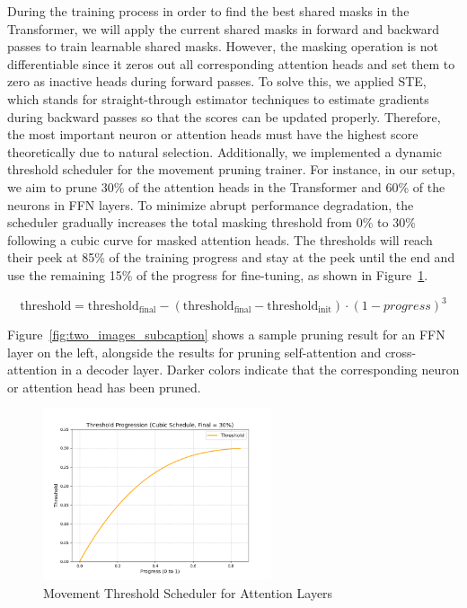 \documentclass{article}
\begin{document}
    \hspace*{1em} During the training process in order to find the best shared masks in the Transformer, we will apply the current shared masks in forward and backward passes to train learnable shared masks. However, the masking operation is not differentiable since it zeros out all corresponding attention heads and set them to zero as inactive heads during forward passes. To solve this, we applied STE, which stands for straight-through estimator techniques to estimate gradients during backward passes so that the scores can be updated properly. Therefore, the most important neuron or attention heads must have the highest score theoretically due to natural selection. Additionally, we implemented a dynamic threshold scheduler for the movement pruning trainer. For instance, in our setup, we aim to prune 30\% of the attention heads in the Transformer and 60\% of the neurons in FFN layers. To minimize abrupt performance degradation, the scheduler gradually increases the total masking threshold from 0\% to 30\% following a cubic curve for masked attention heads. The thresholds will reach their peek at 85\% of the training progress and stay at the peek until the end and use the remaining 15\% of the progress for fine-tuning, as shown in Figure~\ref{fig:sub3}.

    \begin{equation}
        \text{threshold} = \text{threshold}_{\text{final}} - \left( \text{threshold}_{\text{final}} - \text{threshold}_{\text{init}} \right) \cdot (1 - progress)^3
    \end{equation}

    \hspace*{1em} Figure~\ref{fig:two_images_subcaption} shows a sample pruning result for an FFN layer on the left, alongside the results for pruning self-attention and cross-attention in a decoder layer. Darker colors indicate that the corresponding neuron or attention head has been pruned.

    \begin{figure}[hbpt]
        \centering
        \includegraphics[width=0.6\textwidth]{pics/pa/1}
        \caption{Movement Threshold Scheduler for Attention Layers}
        \label{fig:sub3}
    \end{figure}
\end{document}

